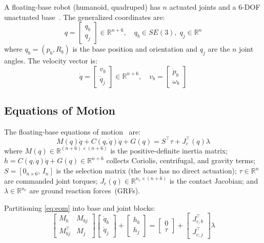 A floating-base robot (humanoid, quadruped) has $n$ actuated joints and a
6-DOF unactuated base~\cite{righetti2011inverse}. The generalized
coordinates are:
\begin{equation}\label{eq:gencoord}
  q = \begin{bmatrix} q_b \\ q_j \end{bmatrix} \in \mathbb{R}^{n+6},
  \quad q_b \in SE(3),\; q_j \in \mathbb{R}^n
\end{equation}
where $q_b=(p_b,R_b)$ is the base position and orientation and $q_j$ are
the $n$ joint angles. The velocity vector is:
\begin{equation}\label{eq:vel}
  \dot{q} = \begin{bmatrix} v_b \\ \dot{q}_j \end{bmatrix} \in \mathbb{R}^{n+6},
  \quad v_b = \begin{bmatrix} \dot{p}_b \\ \omega_b \end{bmatrix}
\end{equation}

\subsection{Equations of Motion}

The floating-base equations of motion~\cite{righetti2011inverse} are:
\begin{equation}\label{eq:eom}
  M(q)\ddot{q} + C(q,\dot{q})\dot{q} + G(q) = S^\top\tau + J_c^\top(q)\lambda
\end{equation}
where $M(q)\in\mathbb{R}^{(n+6)\times(n+6)}$ is the positive-definite
inertia matrix; $h=C(q,\dot{q})\dot{q}+G(q)\in\mathbb{R}^{n+6}$ collects
Coriolis, centrifugal, and gravity terms; $S=[0_{n\times6},\,I_n]$ is the
selection matrix (the base has no direct actuation); $\tau\in\mathbb{R}^n$
are commanded joint torques; $J_c(q)\in\mathbb{R}^{n_c\times(n+6)}$ is the
contact Jacobian; and $\lambda\in\mathbb{R}^{n_c}$ are ground reaction
forces~(GRFs).

Partitioning \eqref{eq:eom} into base and joint blocks:
\begin{equation}\label{eq:partition}
  \begin{bmatrix}M_b & M_{bj} \\ M_{bj}^\top & M_j\end{bmatrix}
  \begin{bmatrix}\ddot{q}_b \\ \ddot{q}_j\end{bmatrix}
  +\begin{bmatrix}h_b \\ h_j\end{bmatrix}
  =\begin{bmatrix}0 \\ \tau\end{bmatrix}
  +\begin{bmatrix}J_{c,b}^\top \\ J_{c,j}^\top\end{bmatrix}\lambda
\end{equation}

